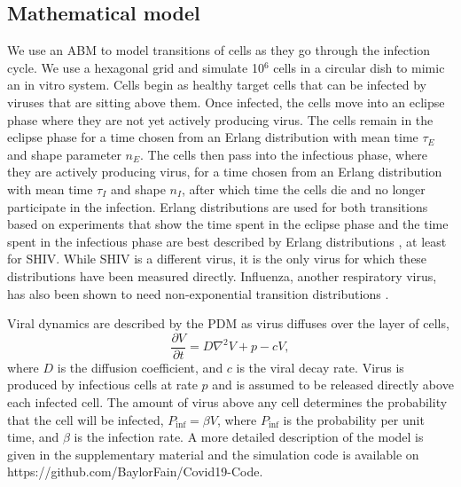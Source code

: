 \subsection{Mathematical model}

We use an ABM to model transitions of cells as they go through the infection cycle. We use a hexagonal grid and simulate 10$^6$ cells in a circular dish to mimic an in vitro system. Cells begin as healthy target cells that can be infected by viruses that are sitting above them. Once infected, the cells move into an eclipse phase where they are not yet actively producing virus. The cells remain in the eclipse phase for a time chosen from an Erlang distribution with mean time $\tau_E$ and shape parameter $n_E$. The cells then pass into the infectious phase, where they are actively producing virus, for a time chosen from an Erlang distribution with mean time $\tau_I$ and shape $n_I$, after which time the cells die and no longer participate in the infection. Erlang distributions are used for both transitions based on experiments that show the time spent in the eclipse phase and the time spent in the infectious phase are best described by Erlang distributions \cite{kakizoe15, beauchemin17}, at least for SHIV. While SHIV is a different virus, it is the only virus for which these distributions have been measured directly. Influenza, another respiratory virus, has also been shown to need non-exponential transition distributions \cite{holder11autoimm, holder11}. 

Viral dynamics are described by the PDM as virus diffuses over the layer of cells,
\begin{equation}
\frac{\partial V}{\partial t} = D\nabla^2V+p-cV,
\end{equation}
where $D$ is the diffusion coefficient, and $c$ is the viral decay rate. Virus is produced by infectious cells at rate $p$ and is assumed to be released directly above each infected cell. The amount of virus above any cell determines the probability that the cell will be infected, $P_\mathrm{inf}=\beta V$, where $P_\mathrm{inf}$ is the probability per unit time, and $\beta$ is the infection rate. A more detailed description of the model is given in the supplementary material and the simulation code is available on https://github.com/BaylorFain/Covid19-Code.

